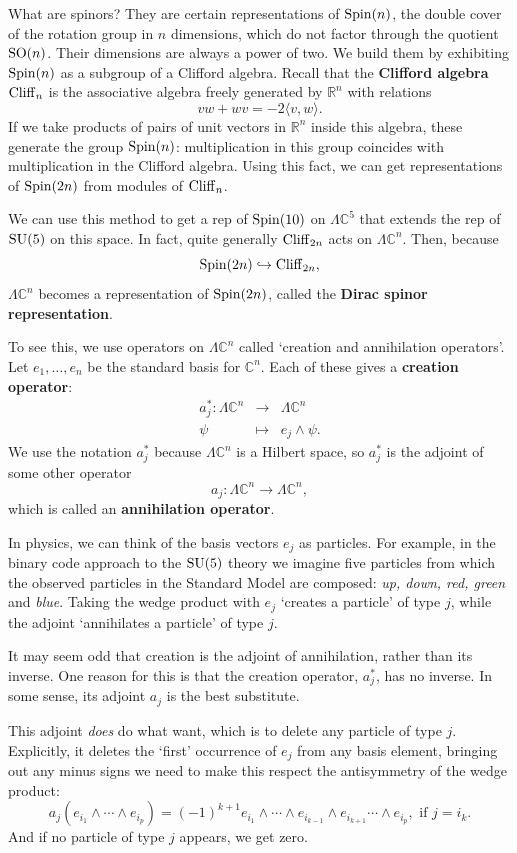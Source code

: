 \documentclass[12pt]{article}
\newcommand{\maps}{\colon}    %
\newcommand{\R}{{\mathbb R}}  %
\newcommand{\C}{{\mathbb C}}  %
\newcommand{\SO}{{\rm SO}}    %
\newcommand{\SU}{{\rm SU}}    %
\newcommand{\Spin}{{\rm Spin}}    %
\newcommand{\Ex}{\Lambda} %
\newcommand{\Cliff}{{\rm Cliff}}    %
\newcommand{\inclusion}{\hookrightarrow}
\begin{document}
What are spinors? They are certain representations of $\Spin(n)$,
the double cover of the rotation group in $n$ dimensions, which do not factor
through the quotient $\SO(n)$. Their dimensions are always a power of two.
We build them by exhibiting $\Spin(n)$ as a subgroup of a 
Clifford algebra.  Recall that the {\bf Clifford algebra} $\Cliff_n$ is
the associative algebra freely generated by $\R^n$ with relations
\[	v w + w v = -2\langle v, w \rangle .	\]
If we take products of pairs of unit vectors in $\R^n$ inside
this algebra, these generate the group $\Spin(n)$: multiplication 
in this group coincides with multiplication in the Clifford algebra.
Using this fact, we can get representations of $\Spin(2n)$ 
from modules of $\Cliff_n$.  

We can use this method to get a rep of $\Spin(10)$ on $\Lambda \C^5$ 
that extends the rep of $\SU(5)$ on this space.
In fact, quite generally $\Cliff_{2n}$ acts on $\Ex \C^n$.  Then, because
\[ \Spin(2n) \inclusion \Cliff_{2n}, \]
$\Ex \C^n$ becomes a representation of $\Spin(2n)$, called the
\textbf{Dirac spinor representation}.  

To see this, we use operators on $\Ex \C^n$ 
called `creation and annihilation operators'.  Let $e_1, \ldots, e_n$ be the 
standard basis for $\C^n$.  Each of these gives a {\bf creation operator}:
\[ 
\begin{array}{rcl}
     a_j^*  \maps \Ex \C^n &\to& \Ex \C^n    \\
                       \psi &\mapsto& e_j \wedge \psi .
\end{array}\]
We use the notation $a_j^*$ because $\Ex \C^n$ is a Hilbert space,
so $a_j^*$ is the adjoint of some other operator
\[         a_j  \maps \Ex \C^n \to \Ex \C^n  ,   \]
which is called an {\bf annihilation operator}.   

In physics, we can think of the basis vectors $e_j$ as particles.
For example, in the binary code approach to the $\SU(5)$
theory we imagine five particles from which the observed
particles in the Standard Model are composed: {\em{up, down, red, green}}
and {\em blue}.  Taking the wedge product with $e_j$ `creates a particle' 
of type $j$, while the adjoint `annihilates a particle' of type $j$.  

It may seem odd that creation is the adjoint of annihilation, 
rather than its inverse. One reason for this is that the creation 
operator, $a_j^*$, has no inverse.  In some sense, its adjoint $a_j$ 
is the best substitute.

This adjoint \emph{does} do what want, which is to delete any particle of type
$j$.  Explicitly, it deletes the `first' occurrence of $e_j$ from any basis
element, bringing out any minus signs we need to make this respect the
antisymmetry of the wedge product:
\[	a_j ( e_{i_1} \wedge \cdots \wedge e_{i_p} ) = 
( -1 )^{k+1} e_{i_1} \wedge \cdots \wedge e_{i_{k-1}} \wedge e_{i_{k+1}} \cdots \wedge e_{i_p}, \mbox{ if }j=i_k.	\]
And if no particle of type $j$ appears, we get zero.
\end{document}
